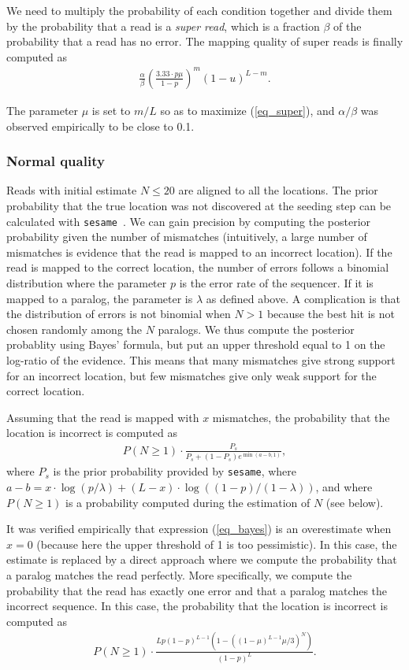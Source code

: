 \documentclass[a4,center,fleqn]{NAR}
\begin{document}
We need to multiply the probability of each condition together and divide
them by the probability that a read is a \emph{super read}, which is a
fraction $\beta$ of the probability that a read has no error. The mapping
quality of super reads is finally computed as
\begin{align}
\label{eq_super}
\frac{\alpha}{\beta} \left( \frac{3.33 \cdot p\mu}{1-p}
\right)^m (1-u)^{L-m}.
\end{align}

The parameter $\mu$ is set to $m/L$ so as to maximize (\ref{eq_super}),
and $\alpha/\beta$ was observed empirically to be close to 0.1.


\subsubsection{Normal quality} Reads with initial estimate $N \leq 20$ are
aligned to all the locations. The prior probability that the true location
was not discovered at the seeding step can be calculated with
\texttt{sesame}~\cite{Filion619155}. We can gain precision by computing
the posterior probability given the number of mismatches (intuitively, a
large number of mismatches is evidence that the read is mapped to an
incorrect location). If the read is mapped to the correct location, the
number of errors follows a binomial distribution where the parameter $p$
is the error rate of the sequencer. If it is mapped to a paralog, the
parameter is $\lambda$ as defined above. A complication is that the
distribution of errors is not binomial when $N > 1$ because the best hit
is not chosen randomly among the $N$ paralogs. We thus compute the
posterior probablity using Bayes' formula, but put an upper threshold equal
to 1 on the log-ratio of the evidence. This means that many mismatches
give strong support for an incorrect location, but few mismatches give
only weak support for the correct location.

Assuming that the read is mapped with $x$ mismatches, the probability that
the location is incorrect is computed as
\begin{align}
\label{eq_bayes}
P(N \geq 1) \cdot \frac{P_s}{P_s + (1-P_s)e^{\min(a-b,1)}},
\end{align}
where $P_s$ is the prior probability provided by \texttt{sesame}, where
$a-b=x \cdot \log(p/\lambda)+(L-x) \cdot \log((1-p)/(1-\lambda))$, and
where $P(N \geq 1)$ is a probability computed during the estimation of $N$
(see below).

It was verified empirically that expression (\ref{eq_bayes}) is an
overestimate when $x = 0$ (because here the upper threshold of 1 is too
pessimistic). In this case, the estimate is replaced by a direct approach
where we compute the probability that a paralog matches the read
perfectly. More specifically, we compute the probability that the read has
exactly one error and that a paralog matches the incorrect sequence. In
this case, the probability that the location is incorrect is computed as
\begin{align}
\label{eq_x0}
P(N \geq 1) \cdot \frac{Lp(1-p)^{L-1}
\left(1-\left((1-\mu)^{L-1}\mu/3\right)^N\right)}{(1-p)^L}.
\end{align}
\end{document}
